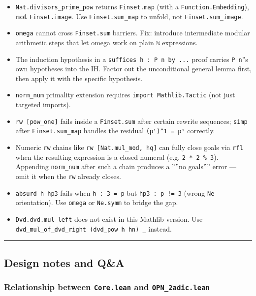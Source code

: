 \documentclass[11pt,a4paper]{article}
\begin{document}
\begin{itemize}
    \item \texttt{Nat.divisors\_prime\_pow} returns \texttt{Finset.map} (with a \texttt{Function.Embedding}), \textbf{not}
\texttt{Finset.image}. Use \texttt{Finset.sum\_map} to unfold, not \texttt{Finset.sum\_image}.
    \item \texttt{omega} cannot cross \texttt{Finset.sum} barriers. Fix: introduce intermediate modular arithmetic
steps that let omega work on plain \texttt{ℕ} expressions.
    \item The induction hypothesis in a \texttt{suffices h : P n by ...} proof carries \texttt{P n}''s
own hypotheses into the IH. Factor out the unconditional general lemma first, then
apply it with the specific hypothesis.
    \item \texttt{norm\_num} primality extension requires \texttt{import Mathlib.Tactic} (not just targeted imports).
    \item \texttt{rw {[}pow\_one{]}} fails inside a \texttt{Finset.sum} after certain rewrite sequences; \texttt{simp} after
\texttt{Finset.sum\_map} handles the residual \texttt{(pⁱ)\^{}1 = pⁱ} correctly.
    \item Numeric \texttt{rw} chains like \texttt{rw {[}Nat.mul\_mod, hq{]}} can fully close goals via \texttt{rfl} when
the resulting expression is a closed numeral (e.g. \texttt{2 * 2 \% 3}). Appending \texttt{norm\_num}
after such a chain produces a ''''no goals'''' error --- omit it when the \texttt{rw} already closes.
    \item \texttt{absurd h hp3} fails when \texttt{h : 3 = p} but \texttt{hp3 : p != 3} (wrong \texttt{Ne} orientation).
Use \texttt{omega} or \texttt{Ne.symm} to bridge the gap.
    \item \texttt{Dvd.dvd.mul\_left} does not exist in this Mathlib version. Use
\texttt{dvd\_mul\_of\_dvd\_right (dvd\_pow h hn) \_} instead.
\end{itemize}

\begin{center}
\rule{0.5\textwidth}{0.4pt}
\end{center}

\subsection{Design notes and Q\&A}

\subsubsection{Relationship between \texttt{Core.lean} and \texttt{OPN\_2adic.lean}}
\end{document}

